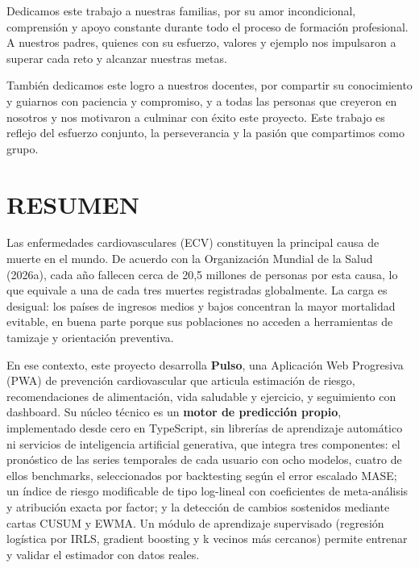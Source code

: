 \documentclass[12pt,letterpaper]{article}
\begin{document}
Dedicamos este trabajo a nuestras familias, por su amor incondicional, comprensión
y apoyo constante durante todo el proceso de formación profesional. A nuestros
padres, quienes con su esfuerzo, valores y ejemplo nos impulsaron a superar cada
reto y alcanzar nuestras metas.

También dedicamos este logro a nuestros docentes, por compartir su conocimiento y
guiarnos con paciencia y compromiso, y a todas las personas que creyeron en
nosotros y nos motivaron a culminar con éxito este proyecto. Este trabajo es
reflejo del esfuerzo conjunto, la perseverancia y la pasión que compartimos como
grupo.

\newpage

\renewcommand{\contentsname}{ÍNDICE}
\tableofcontents

\newpage

\section*{RESUMEN}

Las enfermedades cardiovasculares (ECV) constituyen la principal causa de muerte
en el mundo. De acuerdo con la Organización Mundial de la Salud (2026a), cada año
fallecen cerca de 20,5 millones de personas por esta causa, lo que equivale a una
de cada tres muertes registradas globalmente. La carga es desigual: los países de
ingresos medios y bajos concentran la mayor mortalidad evitable, en buena parte
porque sus poblaciones no acceden a herramientas de tamizaje y orientación
preventiva.

En ese contexto, este proyecto desarrolla \textbf{Pulso}, una Aplicación Web
Progresiva (PWA) de prevención cardiovascular que articula estimación de riesgo,
recomendaciones de alimentación, vida saludable y ejercicio, y seguimiento con
dashboard. Su núcleo técnico es un \textbf{motor de predicción propio},
implementado desde cero en TypeScript, sin librerías de aprendizaje automático ni
servicios de inteligencia artificial generativa, que integra tres componentes: el
pronóstico de las series temporales de cada usuario con ocho modelos, cuatro de
ellos benchmarks, seleccionados por backtesting según el error escalado MASE; un
índice de riesgo modificable de tipo log-lineal con coeficientes de meta-análisis
y atribución exacta por factor; y la detección de cambios sostenidos mediante
cartas CUSUM y EWMA. Un módulo de aprendizaje supervisado (regresión logística
por IRLS, gradient boosting y k vecinos más cercanos) permite entrenar y validar
el estimador con datos reales.
\end{document}
